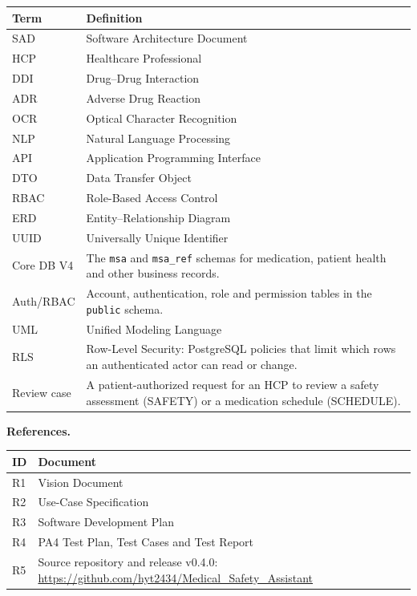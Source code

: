 \documentclass[10pt,letterpaper]{article}
\newcommand{\upd}[1]{{\color{pafourblue}#1}}
\begin{document}
\noindent
\begin{tabularx}{\textwidth}{|L{2.8cm}|Y|}
    \hline
    \textbf{Term} & \textbf{Definition} \\ \hline
    SAD & Software Architecture Document \\ \hline
    HCP & Healthcare Professional \\ \hline
    DDI & Drug--Drug Interaction \\ \hline
    ADR & Adverse Drug Reaction \\ \hline
    OCR & Optical Character Recognition \\ \hline
    NLP & Natural Language Processing \\ \hline
    API & Application Programming Interface \\ \hline
    DTO & Data Transfer Object \\ \hline
    RBAC & Role-Based Access Control \\ \hline
    ERD & Entity--Relationship Diagram \\ \hline
    UUID & Universally Unique Identifier \\ \hline
    Core DB V4 & \upd{The \texttt{msa} and \texttt{msa\_ref} schemas for medication,
    patient health and other business records.} \\ \hline
    Auth/RBAC & \upd{Account, authentication, role and permission tables
    in the \texttt{public} schema.} \\ \hline
    \upd{UML} & \upd{Unified Modeling Language} \\ \hline
    \upd{RLS} & \upd{Row-Level Security: PostgreSQL policies that limit
    which rows an authenticated actor can read or change.} \\ \hline
    \upd{Review case} & \upd{A patient-authorized request for an HCP to review
    a safety assessment (SAFETY) or a medication schedule (SCHEDULE).} \\ \hline
\end{tabularx}


\medskip
\noindent\textbf{References.}

\noindent
\begin{tabularx}{\textwidth}{|L{1.5cm}|Y|}
    \hline
    \textbf{ID} & \textbf{Document} \\ \hline
    R1 & Vision Document \\ \hline
    R2 & Use-Case Specification \\ \hline
    R3 & Software Development Plan \\ \hline
    \upd{R4} & \upd{PA4 Test Plan, Test Cases and Test Report} \\ \hline
    \upd{R5} & \upd{Source repository and release v0.4.0:
    \url{https://github.com/hyt2434/Medical_Safety_Assistant}} \\ \hline
\end{tabularx}
\end{document}
